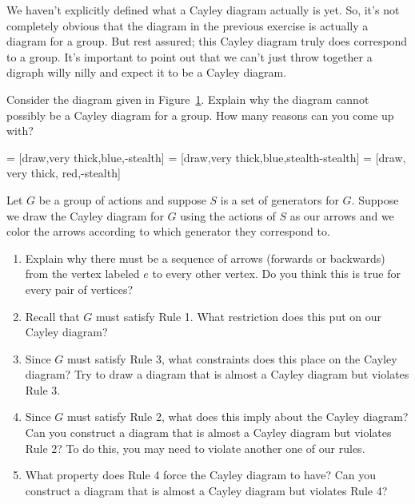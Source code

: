 We haven't explicitly defined what a Cayley diagram actually is yet.  So, it's not completely obvious that the diagram in the previous exercise is actually a diagram for a group.  But rest assured; this Cayley diagram truly does correspond to a group.  It's important to point out that we can't just throw together a digraph willy nilly and expect it to be a Cayley diagram.

\begin{exercise}
Consider the diagram given in Figure~\ref{fig:nonCayley}. Explain why the diagram cannot possibly be a Cayley diagram for a group.  How many reasons can you come up with?
\end{exercise}

 = [draw,very thick,blue,-stealth]
 = [draw,very thick,blue,stealth-stealth]
 = [draw, very thick, red,-stealth]

\begin{figure}[!ht]
\centering
{}
\caption{}
\label{fig:nonCayley}
\end{figure}

\begin{exercise}\label{exer:properties_Cayley}
Let $G$ be a group of actions and suppose $S$ is a set of generators for $G$. Suppose we draw the Cayley diagram for $G$ using the actions of $S$ as our arrows and we color the arrows according to which generator they correspond to.  
\begin{enumerate}[label=\rm{(\alph*)}]
\item Explain why there must be a sequence of arrows (forwards or backwards) from the vertex labeled $e$ to every other vertex.  Do you think this is true for every pair of vertices?
\item Recall that $G$ must satisfy Rule 1.  What restriction does this put on our Cayley diagram?
\item Since $G$ must satisfy Rule 3, what constraints does this place on the Cayley diagram?  Try to draw a diagram that is almost a Cayley diagram but violates Rule 3.
\item Since $G$ must satisfy Rule 2, what does this imply about the Cayley diagram?  Can you construct a diagram that is almost a Cayley diagram but violates Rule 2?  To do this, you may need to violate another one of our rules.
\item What property does Rule 4 force the Cayley diagram to have?  Can you construct a diagram that is almost a Cayley diagram but violates Rule 4? 
\end{enumerate}
\end{exercise}

